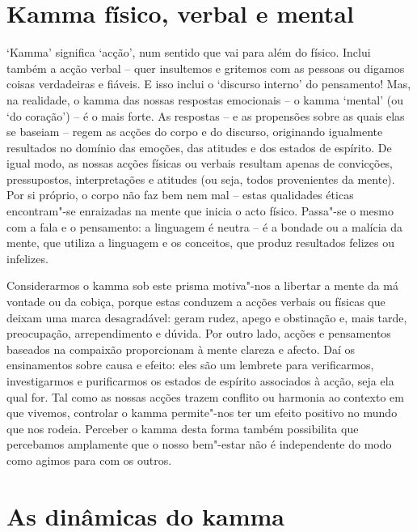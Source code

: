 \section{Kamma físico, verbal e mental}

`Kamma' significa `acção', num sentido que vai para além do físico. Inclui
também a acção verbal -- quer insultemos e gritemos com as pessoas ou digamos
coisas verdadeiras e fiáveis. E isso inclui o `discurso interno' do pensamento!
Mas, na realidade, o kamma das nossas respostas emocionais -- o kamma `mental'
(ou `do coração') -- é o mais forte. As respostas -- e as propensões sobre as
quais elas se baseiam -- regem as acções do corpo e do discurso, originando
igualmente resultados no domínio das emoções, das atitudes e dos estados de
espírito. De igual modo, as nossas acções físicas ou verbais resultam apenas de
convicções, pressupostos, interpretações e atitudes (ou seja, todos provenientes
da mente). Por si próprio, o corpo não faz bem nem mal -- estas qualidades
éticas encontram"-se enraizadas na mente que inicia o acto físico. Passa"-se o
mesmo com a fala e o pensamento: a linguagem é neutra -- é a bondade ou a
malícia da mente, que utiliza a linguagem e os conceitos, que produz resultados
felizes ou infelizes.

Considerarmos o kamma sob este prisma motiva"-nos a libertar a mente da má
vontade ou da cobiça, porque estas conduzem a acções verbais ou físicas que
deixam uma marca desagradável: geram rudez, apego e obstinação e, mais tarde,
preocupação, arrependimento e dúvida. Por outro lado, acções e pensamentos
baseados na compaixão proporcionam à mente clareza e afecto. Daí os ensinamentos
sobre causa e efeito: eles são um lembrete para verificarmos, investigarmos e
purificarmos os estados de espírito associados à acção, seja ela qual for. Tal
como as nossas acções trazem conflito ou harmonia ao contexto em que vivemos,
controlar o kamma permite"-nos ter um efeito positivo no mundo que nos rodeia.
Perceber o kamma desta forma também possibilita que percebamos amplamente que o
nosso bem"-estar não é independente do modo como agimos para com os outros.

\section{As dinâmicas do kamma}

